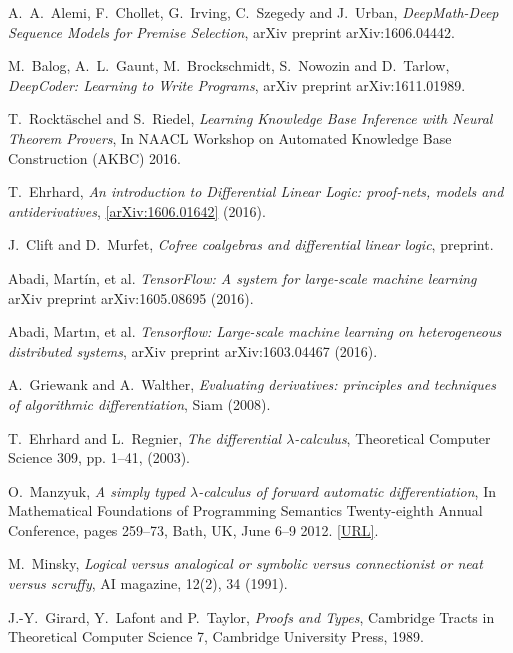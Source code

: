 \documentclass[english,letter paper,12pt,leqno]{article}
\theoremstyle{example}
\numberwithin{equation}{section}
\begin{document}
\begin{thebibliography}{BHLS03}
A.~A.~Alemi, F.~Chollet, G.~Irving, C.~Szegedy and J.~Urban, \textsl{DeepMath-Deep Sequence Models for Premise Selection}, arXiv preprint arXiv:1606.04442.

M.~Balog, A.~L.~Gaunt, M.~Brockschmidt, S.~Nowozin and D.~Tarlow, \textsl{DeepCoder: Learning to Write Programs}, arXiv preprint arXiv:1611.01989.

T.~Rockt\"aschel and S.~Riedel, \textsl{Learning Knowledge Base Inference with Neural Theorem Provers}, In NAACL Workshop on Automated Knowledge Base Construction (AKBC) 2016.

T.~Ehrhard, \textsl{An introduction to Differential Linear Logic: proof-nets, models and antiderivatives}, \href{https://arxiv.org/abs/1606.01642}{[arXiv:1606.01642]} (2016).

J.~Clift and D.~Murfet, \textsl{Cofree coalgebras and differential linear logic}, preprint.

Abadi, Martín, et al. \textsl{TensorFlow: A system for large-scale machine learning} arXiv preprint arXiv:1605.08695 (2016).

Abadi, Martın, et al. \textsl{Tensorflow: Large-scale machine learning on heterogeneous distributed systems}, arXiv preprint arXiv:1603.04467 (2016).

A.~Griewank and A.~Walther, \textsl{Evaluating derivatives: principles and techniques of algorithmic differentiation}, Siam (2008).

T.~Ehrhard and L.~Regnier, \textsl{The differential $\lambda$-calculus}, Theoretical Computer Science 309, pp. 1--41, (2003).

O.~Manzyuk, \textsl{A simply typed $\lambda$-calculus of forward automatic differentiation}, In Mathematical Foundations of Programming Semantics Twenty-eighth Annual Conference, pages 259--73, Bath, UK, June 6–9 2012. \href{http://dauns.math.tulane.edu/~mfps/mfps28proc.pdf}{[URL]}.

M.~Minsky, \textsl{Logical versus analogical or symbolic versus connectionist or neat versus scruffy}, AI magazine, 12(2), 34 (1991).

J.-Y.~Girard, Y.~Lafont and P.~Taylor, \textsl{Proofs and Types}, Cambridge Tracts in Theoretical Computer Science 7, Cambridge University Press, 1989.

\end{thebibliography}
\end{document}
